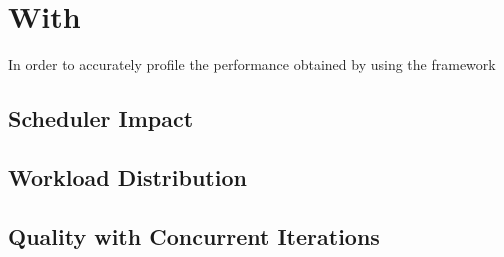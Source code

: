 \documentclass[main.tex]{subfiles}
\begin{document}
\section{With \starpu}

In order to accurately profile the performance obtained by using the framework

\subsection{Scheduler Impact}

\subsection{Workload Distribution}

\subsection{Quality with Concurrent Iterations}
\end{document}
